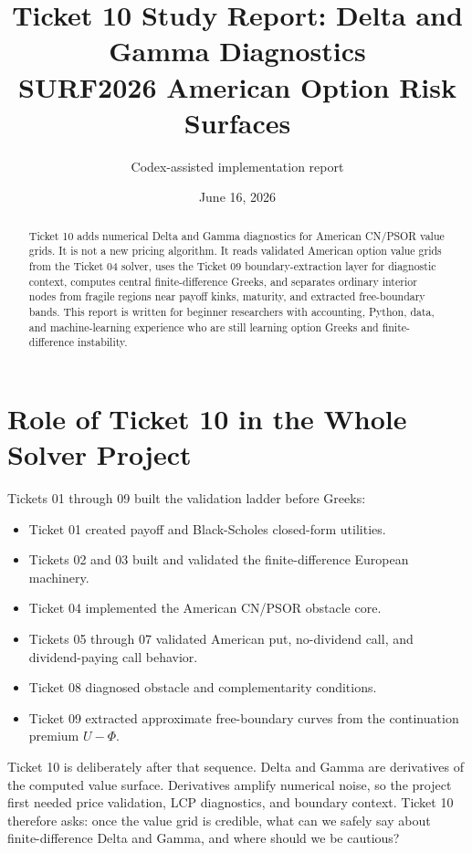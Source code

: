\documentclass[11pt,a4paper]{article}
\title{\textbf{Ticket 10 Study Report: Delta and Gamma Diagnostics}\\
\large SURF2026 American Option Risk Surfaces}
\author{Codex-assisted implementation report}
\date{June 16, 2026}
\begin{document}
\maketitle

\begin{abstract}
Ticket 10 adds numerical Delta and Gamma diagnostics for American CN/PSOR value grids. It is
not a new pricing algorithm. It reads validated American option value grids from the Ticket 04
solver, uses the Ticket 09 boundary-extraction layer for diagnostic context, computes central
finite-difference Greeks, and separates ordinary interior nodes from fragile regions near
payoff kinks, maturity, and extracted free-boundary bands. This report is written for beginner
researchers with accounting, Python, data, and machine-learning experience who are still learning
option Greeks and finite-difference instability.
\end{abstract}

\tableofcontents
\newpage

\section{Role of Ticket 10 in the Whole Solver Project}

Tickets 01 through 09 built the validation ladder before Greeks:
\begin{itemize}
  \item Ticket 01 created payoff and Black-Scholes closed-form utilities.
  \item Tickets 02 and 03 built and validated the finite-difference European machinery.
  \item Ticket 04 implemented the American CN/PSOR obstacle core.
  \item Tickets 05 through 07 validated American put, no-dividend call, and dividend-paying call behavior.
  \item Ticket 08 diagnosed obstacle and complementarity conditions.
  \item Ticket 09 extracted approximate free-boundary curves from the continuation premium \(U-\Phi\).
\end{itemize}

Ticket 10 is deliberately after that sequence. Delta and Gamma are derivatives of the computed
value surface. Derivatives amplify numerical noise, so the project first needed price validation,
LCP diagnostics, and boundary context. Ticket 10 therefore asks: once the value grid is credible,
what can we safely say about finite-difference Delta and Gamma, and where should we be cautious?
\end{document}
